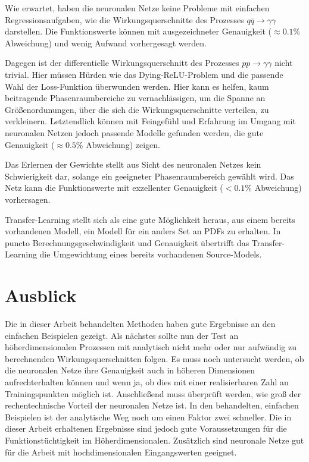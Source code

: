 Wie erwartet, haben die neuronalen Netze keine Probleme mit einfachen Regressionsaufgaben, wie die Wirkungsquerschnitte des Prozesses $q\overline{q} \rightarrow \gamma \gamma$ darstellen. Die Funktionswerte können mit ausgezeichneter Genauigkeit ($\approx 0.1\%$ Abweichung) und wenig Aufwand vorhergesagt werden.

Dagegen ist der differentielle Wirkungsquerschnitt des Prozesses $pp \rightarrow \gamma \gamma$ nicht trivial. Hier müssen Hürden wie das Dying-ReLU-Problem und die passende Wahl der Loss-Funktion überwunden werden. Hier kann es helfen, kaum beitragende Phasenraumbereiche zu vernachlässigen, um die Spanne an Größenordunungen, über die sich die Wirkungsquerschnitte verteilen, zu verkleinern. Letztendlich können mit Feingefühl und Erfahrung im Umgang mit neuronalen Netzen jedoch passende Modelle gefunden werden, die gute Genauigkeit ($\approx 0.5\%$ Abweichung) zeigen.

Das Erlernen der Gewichte stellt aus Sicht des neuronalen Netzes kein Schwierigkeit dar, solange ein geeigneter Phasenraumbereich gewählt wird. Das Netz kann die Funktionswerte mit exzellenter Genauigkeit ($<0.1\%$ Abweichung) vorhersagen.

Transfer-Learning stellt sich als eine gute Möglichkeit heraus, aus einem bereits vorhandenen Modell, ein Modell für ein anders Set an PDFs zu erhalten. In puncto Berechnungsgeschwindigkeit und Genauigkeit übertrifft das Transfer-Learning die Umgewichtung eines bereits vorhandenen Source-Models.

\section{Ausblick}
Die in dieser Arbeit behandelten Methoden haben gute Ergebnisse an den einfachen Beispielen gezeigt. Als nächstes sollte nun der Test an höherdimensionalen Prozessen mit analytisch nicht mehr oder nur aufwändig zu berechnenden Wirkungsquerschnitten folgen. Es muss noch untersucht werden, ob die neuronalen Netze ihre Genauigkeit auch in höheren Dimensionen aufrechterhalten können und wenn ja, ob dies mit einer realisierbaren Zahl an Trainingspunkten möglich ist. Anschließend muss überprüft werden, wie groß der rechentechnische Vorteil der neuronalen Netze ist. In den behandelten, einfachen Beispielen ist der analytische Weg noch um einen Faktor zwei schneller. Die in dieser Arbeit erhaltenen Ergebnisse sind jedoch gute Voraussetzungen für die Funktionstüchtigkeit im Höherdimensionalen. Zusätzlich sind neuronale Netze gut für die Arbeit mit hochdimensionalen Eingangswerten geeignet.

